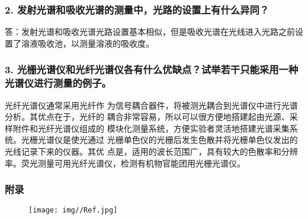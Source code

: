 \documentclass[12pt,a4paper,UTF8]{ctexart}
\begin{document}
\subsubsection*{2. 发射光谱和吸收光谱的测量中，光路的设置上有什么异同？}
答：发射光谱和吸收光谱光路设置基本相似，但是吸收光谱在光线进入光路之前设
置了溶液吸收池，以测量溶液的吸收度。

\subsubsection*{3. 光栅光谱仪和光纤光谱仪各有什么优缺点？试举若干只能采用一种光谱仪进行测量的例子。}
光纤光谱仪通常采用光纤作
为信号耦合器件，将被测光耦合到光谱仪中进行光谱分析。其优点在于，光纤的
耦合非常容易，所以可以很方便地搭建起由光源、采样附件和光纤光谱仪组成的
模块化测量系统，方便实验者灵活地搭建光谱采集系统。光栅光谱仪是使光通过
光栅单色仪的光栅后发生色散并将光栅单色仪发出的光线记录下来的仪器。其优
点是，适用的波长范围广，具有较大的色散率和分辨率。荧光测量可用光纤光谱仪，检测有机物官能团用光栅光谱仪。

\subsubsection*{附录}
\begin{figure}[htbp]
	\centering
	\texttt{[image: img//Ref.jpg]}
\end{figure}
\end{document}
